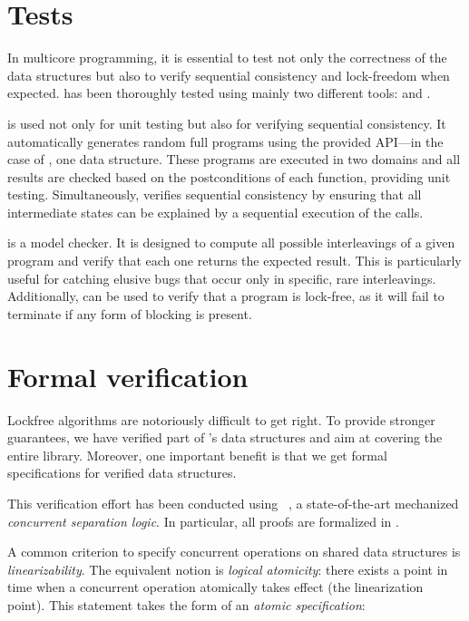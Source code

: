 \documentclass[a4paper, 11pt]{article}
\begin{document}

\section{Tests}

In multicore programming, it is essential to test not only the correctness of the data structures but also to verify sequential consistency and lock-freedom when expected.
\Saturn has been thoroughly tested using mainly two different tools: \DSCheck and \STM.

\STM is used not only for unit testing but also for verifying sequential consistency.
It automatically generates random full programs using the provided API---in the case of \Saturn, one data structure.
These programs are executed in two domains and all results are checked based on the postconditions of each function, providing unit testing.
Simultaneously, \STM verifies sequential consistency by ensuring that all intermediate states can be explained by a sequential execution of the calls.

\DSCheck is a model checker.
It is designed to compute all possible interleavings of a given program and verify that each one returns the expected result.
This is particularly useful for catching elusive bugs that occur only in specific, rare interleavings.
Additionally, \DSCheck can be used to verify that a program is lock-free, as it will fail to terminate if any form of blocking is present.

\section{Formal verification}

Lockfree algorithms are notoriously difficult to get right.
To provide stronger guarantees, we have verified part of \Saturn's data structures and aim at covering the entire library.
Moreover, one important benefit is that we get formal specifications for verified data structures.

This verification effort has been conducted using \Iris~\cite{DBLP:journals/jfp/JungKJBBD18}, a state-of-the-art mechanized \emph{concurrent separation logic}.
In particular, all proofs are formalized in \Coq.

A common criterion to specify concurrent operations on shared data structures is \emph{linearizability}.
The equivalent \Iris notion is \emph{logical atomicity}: there exists a point in time when a concurrent operation atomically takes effect (the linearization point).
This statement takes the form of an \emph{atomic specification}:
\end{document}

